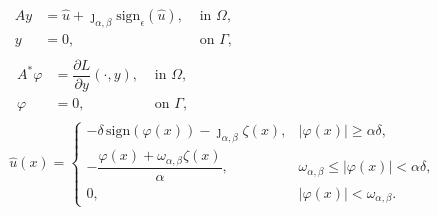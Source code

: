 \documentclass[11pt,a4paper]{amsart}
\newcommand{\ds}{\displaystyle}
\renewcommand{\l}{\left}
\renewcommand{\r}{\right}
\newcommand{\om}{\Omega}
\newcommand{\ga}{\Gamma}
\newcommand{\sign}{\mathrm{sign}}
\begin{document}
\begin{subequations}\label{eq:reg_system}
	\begin{align}
&\begin{array}{rlc}
	A y  & = \hat u + \jmath_{\alpha,\beta}\sign_\epsilon(\hat u), & \text{ in } \om, \\
     y &= 0, & \text{ on } \ga, 
\end{array}\label{eq:optimal_system_P0_a}\\
%
&\,\begin{array}{rlc}
	A^*\varphi & = \dfrac{\partial L}{\partial y}(\cdot, y),& \text{ in } \om, \\
      \varphi &= 0, & \text{ on } \ga ,
\end{array} \label{eq:optimal_system_P0_b}\\
&\hat u(x)=\ds
\begin{cases} 
-\delta\,\sign(\varphi(x))-\jmath_{\alpha,\beta}\zeta(x), &|\varphi(x)|\ge \alpha \delta,\\
-\dfrac{\varphi(x)+\omega_{\alpha,\beta}\zeta(x)}{\alpha},&\omega_{\alpha,\beta}\le |\varphi(x)|<\alpha\delta,\\
0, &|\varphi(x)|<\omega_{\alpha,\beta}.
\end{cases}
\label{eq:optimal_system_P_d}
\end{align}
\end{subequations}	

\end{document}
